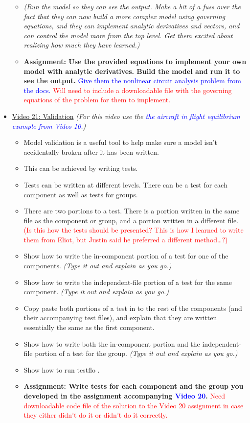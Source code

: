 \documentclass[12pt, letterpaper]{article}
\begin{document}
\begin{itemize}
\begin{itemize}
			\item \textit{(Run the model so they can see the output. Make a bit of a fuss over the fact that they can now build a more complex model using governing equations, and they can implement analytic derivatives and vectors, and can control the model more from the top level. Get them excited about realizing how much they have learned.)}
			\item \textbf{Assignment: Use the provided equations to implement your own model with analytic derivatives. Build the model and run it to see the output.} \textcolor{blue}{Give them the nonlinear circuit analysis problem from the docs.} \textcolor{red}{Will need to include a downloadable file with the governing equations of the problem for them to implement.}
		\end{itemize}
		
	\item \underline{Video 21: Validation} \textit{(For this video use the \textcolor{blue}{the aircraft in flight equilibrium example from Video 10.})} 
		\begin{itemize}
			\item Model validation is a useful tool to help make sure a model isn’t accidentally broken after it has been written.
			\item This can be achieved by writing tests.
			\item Tests can be written at different levels. There can be a test for each component as well as tests for groups. 
			\item There are two portions to a test. There is a portion written in the same file as the component or group, and a portion written in a different file. \textcolor{red}{(Is this how the tests should be presented? This is how I learned to write them from Eliot, but Justin said he preferred a different method…?)}
			\item Show how to write the in-component portion of a test for one of the components. \textit{(Type it out and explain as you go.)}
			\item Show how to write the independent-file portion of a test for the same component. \textit{(Type it out and explain as you go.)}
			\item Copy paste both portions of a test in to the rest of the components (and their accompanying test files), and explain that they are written essentially the same as the first component.
			\item Show how to write both the in-component portion and the independent-file portion of a test for the group. \textit{(Type it out and explain as you go.)}
			\item Show how to run testflo .
			\item \textbf{Assignment: Write tests for each component and the group you developed in the assignment accompanying \textcolor{blue}{Video 20}.} \textcolor{red}{Need downloadable code file of the solution to the Video 20 assignment in case they either didn't do it or didn't do it correctly.}
		\end{itemize}
	

\end{itemize}
\end{document}
